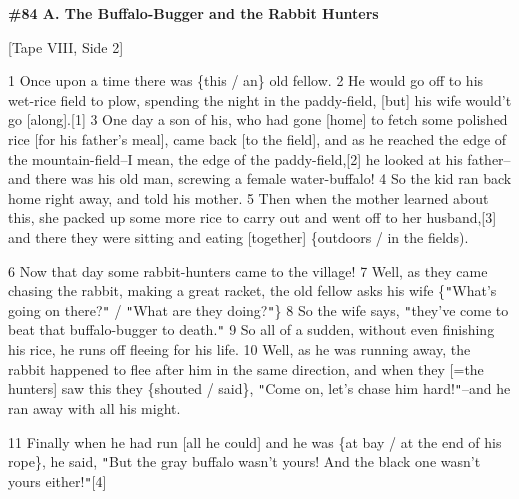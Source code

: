
\textbf{\#84 A. The Buffalo-Bugger and the Rabbit Hunters}

[Tape VIII, Side 2]

1 Once upon a time there was \{this / an\} old fellow. 2 He would go off to his
wet-rice field to plow, spending the night in the paddy-field, [but] his wife would't
go [along].[1] 3 One day a son of his, who had gone [home] to fetch some polished
rice [for his father's meal], came back [to the field], and as he reached the edge
of the mountain-field--I mean, the edge of the paddy-field,[2] he looked at his
father--and there was his old man, screwing a female water-buffalo! 4 So the kid
ran back home right away, and told his mother. 5 Then when the mother learned about
this, she packed up some more rice to carry out and went off to her husband,[3]
and there they were sitting and eating [together] \{outdoors / in the fields).

6 Now that day some rabbit-hunters came to the village! 7 Well, as they came chasing
the rabbit, making a great racket, the old fellow asks his wife \{\texttt{"}What's
going on there?\texttt{"} / \texttt{"}What are they doing?\texttt{"}\} 8 So the
wife says, \texttt{"}they've come to beat that buffalo-bugger to death.\texttt{"}
9 So all of a sudden, without even finishing his rice, he runs off fleeing for
his life. 10 Well, as he was running away, the rabbit happened to flee after him
in the same direction, and when they [=the hunters] saw this they \{shouted / said\},
\texttt{"}Come on, let's chase him hard!\texttt{"}--and he ran away with all his
might.

11 Finally when he had run [all he could] and he was \{at bay / at the end of his
rope\}, he said, \texttt{"}But the gray buffalo wasn't yours! And the black one
wasn't yours either!\texttt{"}[4]

